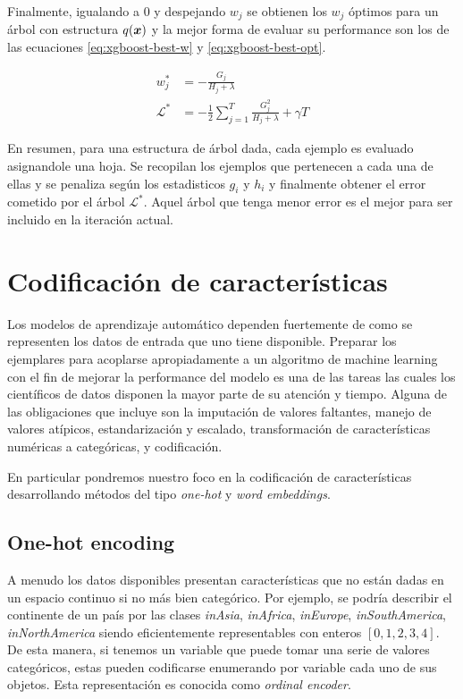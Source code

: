 Finalmente, igualando a $0$ y despejando $w_j$ se obtienen los $w_j$ óptimos para
un árbol con estructura $q(\boldsymbol{x})$ y la mejor forma de evaluar su performance
son los de las ecuaciones \ref{eq:xgboost-best-w} y \ref{eq:xgboost-best-opt}.

\begin{align}
    w_{j}^{*} &= - \frac{G_j}{H_j + \lambda} \label{eq:xgboost-best-w}\\
    \mathcal{L}^{*} &= -\frac{1}{2} \sum_{j=1}^{T} \frac{G_{j}^{2}}{H_j + \lambda} + \gamma T \label{eq:xgboost-best-opt}
\end{align}

En resumen, para una estructura de árbol dada, cada ejemplo es evaluado
asignandole una hoja. Se recopilan los ejemplos que pertenecen a cada una de
ellas y se penaliza según los estadisticos $g_i$ y $h_i$ y finalmente obtener el
error cometido por el árbol $\mathcal{L^{*}}$. Aquel árbol que tenga menor error
es el mejor para ser incluido en la iteración actual.

\section{Codificación de características}

Los modelos de aprendizaje automático dependen fuertemente de como se
representen los datos de entrada que uno tiene disponible. Preparar los
ejemplares para acoplarse apropiadamente a un algoritmo de machine learning con
el fin de mejorar la performance del modelo es una de las tareas las cuales los
científicos de datos disponen la mayor parte de su atención y tiempo. Alguna de
las obligaciones que incluye son la imputación de valores faltantes, manejo de
valores atípicos, estandarización y escalado, transformación de características
numéricas a categóricas, y codificación.

En particular pondremos nuestro foco en la codificación de características
desarrollando métodos del tipo \emph{one-hot} y \emph{word embeddings}.

\subsection{One-hot encoding}

A menudo los datos disponibles presentan características que no están dadas en
un espacio continuo si no más bien categórico. Por ejemplo, se podría describir
el continente de un país por las clases \emph{inAsia}, \emph{inAfrica},
\emph{inEurope}, \emph{inSouthAmerica}, \emph{inNorthAmerica} siendo
eficientemente representables con enteros $[0, 1, 2, 3, 4]$. De esta manera, si
tenemos un variable que puede tomar una serie de valores categóricos, estas pueden codificarse enumerando
por variable cada uno de sus objetos. Esta representación es conocida como
\emph{ordinal encoder}.

